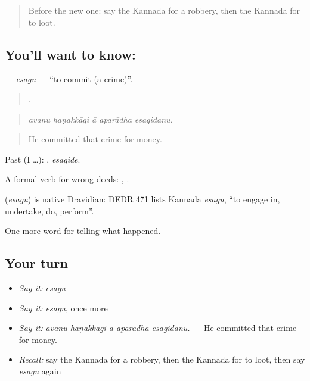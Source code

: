 \label{lesson:KA-C328-esagu}



\begin{quote}
Before the new one: say the Kannada for a robbery, then the Kannada for to loot.
\end{quote}

\subsection*{You'll want to know: }
\textbf{} — \emph{esagu} — \textquotedblleft{}to commit (a crime)\textquotedblright{}.

\begin{quote}
    .
\end{quote}

\begin{quote}
\emph{avanu haṇakkāgi ā aparādha esagidanu.}
\end{quote}

\begin{quote}
He committed that crime for money.
\end{quote}

Past (I …): , \emph{esagide}.

A formal verb for wrong deeds:  ,  .

\begin{cousinweb}
\textbf{} (\emph{esagu}) is native Dravidian: DEDR 471 lists Kannada \emph{esagu}, \textquotedblleft{}to engage in, undertake, do, perform\textquotedblright{}.
\end{cousinweb}

\begin{grammarlens}[title={What you've built}]
One more word for telling what happened.
\end{grammarlens}

\subsection*{Your turn}
\begin{itemize}
\raggedright
  \item \emph{Say it:} \emph{esagu}
  \item \emph{Say it:} \emph{esagu}, once more
  \item \emph{Say it:} \emph{avanu haṇakkāgi ā aparādha esagidanu.} — He committed that crime for money.
  \item \emph{Recall:} say the Kannada for a robbery, then the Kannada for to loot, then say \emph{esagu} again
\end{itemize}

